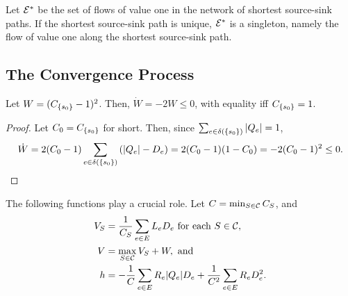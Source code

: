 \documentclass[11pt,a4paper]{article}
\newcommand{\E}{\cal E}
\newcommand{\Estar}{\E^*}
\begin{document}
Let $\Estar$ be the set of flows of value
one in the network of shortest source-sink paths. If the shortest source-sink
path is unique, $\Estar$ is a singleton, namely the flow of value one along the
shortest source-sink path. 

\subsection{The Convergence Process}


\begin{lemma}
\label{lem:monotonicity-sourcecut}
Let $W = (\capa(\{s_0\})-1)^2$. Then, $\dot{W} = -2 W \le 0$, with equality iff 
$\capa(\{s_0\})=1$. 
\end{lemma}
\begin{proof} 
Let $C_0 = \capa(\{s_0\})$ for short. Then, since $\sum_{e \in \delta(\{s_0\})} | Q_e |=1$,  
$$ 
\dot{W} = 2(C_0 -1) \sum_{e \in \delta(\{s_0\})} \left(| Q_e | - D_e
\right) = 2(C_0 -1) (1 - C_0) = -2 (C_0 -1)^2 \le 0. 
$$\Lnegskip
\end{proof}

\noindent 
The following functions play a crucial role. Let $C=\min_{S \in {\cal C}} C_S$, and  
\begin{align*}
V_S &= \frac{1}{C_S} \sum_{e \in E} L_e D_e \text{ for each } S \in {\cal C}, \\
V &= \max_{S \in {\cal C}} V_S + W, \text{ and}\\
h &= - \frac{1}{C} \sum_{e \in E} R_e | Q_e | D_e + \frac{1}{C^2} \sum_{e \in E} R_e D_e^2. 
\end{align*}


\end{document}
